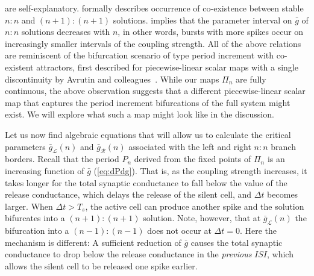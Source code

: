  are self-explanatory.
 formally describes occurrence of co-existence between stable $n:n$ and $(n+1):(n+1)$ solutions.
 implies that the parameter interval on $\bar g$ of $n:n$ solutions decreases with $n$, in other words, bursts with more spikes occur on increasingly smaller intervals of the coupling strength.
All of the above relations are reminiscent of the bifurcation scenario of type period increment with co-existent attractors, first described for piecewise-linear scalar maps with a single discontinuity by Avrutin and colleagues~\cite[e.g.
	see][]{gardini2012,tramontana2012,avrutin2011}.
While our maps $\Pi_n$ are fully continuous, the above observation suggests that a different piecewise-linear scalar map that captures the period increment bifurcations of the full system might exist.
We will explore what such a map might look like in the discussion.

Let us now find algebraic equations that will allow us to calculate the critical parameters $\bar g_{\mathcal{L}}(n)$ and $\bar g_{\mathcal{R}}(n)$ associated with the left and right $n:n$ branch borders.
Recall that the period $P_n$ derived from the fixed points of $\Pi_n$ is an increasing function of $\bar g$ (\cref{eq:dPdg}).
That is, as the coupling strength increases, it takes longer for the total synaptic conductance to fall below the value of the release conductance, which delays the release of the silent cell, and $\Delta t$ becomes larger.
When $\Delta t > T_{s}$, the active cell can produce another spike and the solution bifurcates into a $(n+1):(n+1)$ solution.
Note, however, that at $\bar g_{\mathcal{L}}(n)$ the bifurcation into a $(n-1):(n-1)$ does not occur at $\Delta t = 0$.
Here the mechanism is different: A sufficient reduction of $\bar g$ causes the total synaptic conductance to drop below the release conductance in the \emph{previous} $ISI$, which allows the silent cell to be released one spike earlier.

